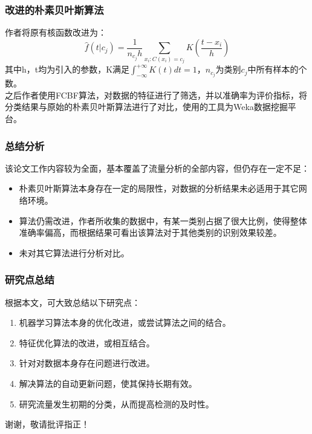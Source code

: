 \documentclass{beamer}
\begin{document}
\begin{frame}[fragile]
	\frametitle{改进的朴素贝叶斯算法}
	    作者将原有核函数改进为：
	    $$\hat{f}(t|c_j) = \frac{1}{n_{c_j}h}\sum_{x_i : C(x_i) = c_j} K(\frac{t-x_i}{h})$$
	    其中h，t均为引入的参数，K满足$\int_{-\infty}^{+\infty}K(t)dt = 1$，$n_{c_j}$为类别$c_j$中所有样本的个数。\\
	    之后作者使用FCBF算法，对数据的特征进行了筛选，并以准确率为评价指标，将分类结果与原始的朴素贝叶斯算法进行了对比，使用的工具为Weka数据挖掘平台。
	    
\end{frame}

\begin{frame}
    \frametitle{总结分析}
    该论文工作内容较为全面，基本覆盖了流量分析的全部内容，但仍存在一定不足：
    \begin{itemize}
        \item 朴素贝叶斯算法本身存在一定的局限性，对数据的分析结果未必适用于其它网络环境。
        \item 算法仍需改进，作者所收集的数据中，有某一类别占据了很大比例，使得整体准确率偏高，而根据结果可看出该算法对于其他类别的识别效果较差。
        \item 未对其它算法进行分析对比。
    \end{itemize}
\end{frame}

\begin{frame}
    \frametitle{研究点总结}
    根据本文，可大致总结以下研究点：
    \begin{enumerate}
        \item 机器学习算法本身的优化改进，或尝试算法之间的结合。
        \item 特征优化算法的改进，或相互结合。
        \item 针对对数据本身存在问题进行改进。
        \item 解决算法的自动更新问题，使其保持长期有效。
        \item 研究流量发生初期的分类，从而提高检测的及时性。
    \end{enumerate}
\end{frame}
\begin{frame}
    谢谢，敬请批评指正！
\end{frame}
\end{document}
